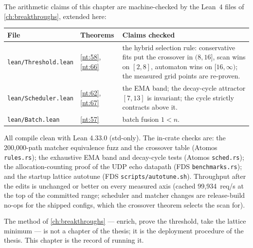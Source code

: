 The arithmetic claims of this chapter are machine-checked by the Lean~4
files of \autoref{ch:breakthroughs}, extended here:

\begin{center}
\begin{tabular}{@{}llp{8cm}@{}}
\toprule
File & Theorems & Claims checked\\
\midrule
\texttt{lean/Threshold.lean} & \ref{nt:58}, \ref{nt:66} & the hybrid
selection rule: conservative fits put the crossover in $(8,16]$, scan
wins on $[2,8]$, automaton wins on $[16,\infty)$; the measured grid
points are re-proven.\\
\texttt{lean/Scheduler.lean} & \ref{nt:62}, \ref{nt:67} & the EMA band;
the decay-cycle attractor $[7,13]$ is invariant; the cycle strictly
contracts above it.\\
\texttt{lean/Batch.lean} & \ref{nt:57} & batch fusion $1 < n$.\\
\bottomrule
\end{tabular}
\end{center}

All compile clean with Lean 4.33.0 (std-only). The in-crate checks are:
the 200{,}000-path matcher equivalence fuzz and the crossover table
(Atomos \texttt{rules.rs}); the exhaustive EMA band and decay-cycle
tests (Atomos \texttt{sched.rs}); the allocation-counting proof of the
UDP echo datapath (FDS \texttt{benchmarks.rs}); and the startup lattice
autotune (FDS \texttt{scripts/autotune.sh}). Throughput after the edits
is unchanged or better on every measured axis (cached 99{,}934~req/s at
the top of the committed range; scheduler and matcher changes are
release-build no-ops for the shipped configs, which the crossover
theorem selects the scan for).

The method of \autoref{ch:breakthroughs} --- enrich, prove the
threshold, take the lattice minimum --- is not a chapter of the thesis;
it is the deployment procedure of the thesis. This chapter is the
record of running it.
